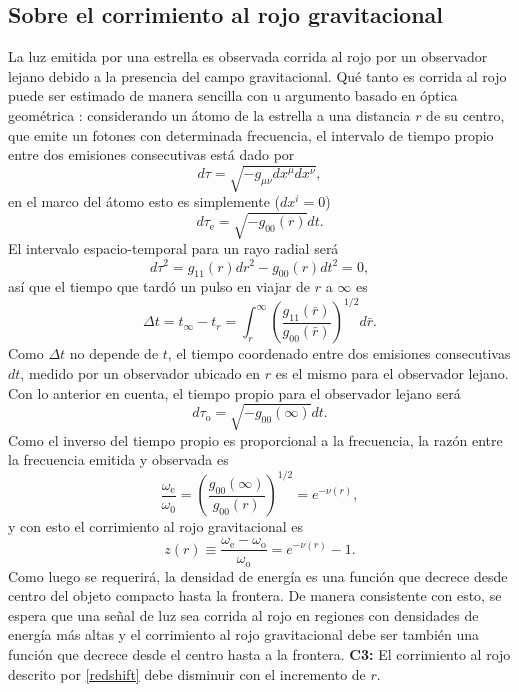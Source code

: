 \subsection*{ Sobre el corrimiento al rojo gravitacional}
\noindent La luz emitida por una estrella es observada corrida al rojo por un observador lejano debido a la presencia del campo gravitacional. Qué tanto es corrida al rojo puede ser estimado de manera sencilla con u argumento basado en óptica geométrica \cite{Glendenning2000}: considerando un átomo de la estrella a una distancia $r$ de su centro, que emite un fotones con determinada frecuencia, el intervalo de tiempo propio entre dos emisiones consecutivas está dado por
\begin{equation}
d \tau=\sqrt{-g_{\mu \nu} d x^{\mu} d x^{\nu}},
\end{equation}
en el marco del átomo esto es simplemente ($dx^i=0$)
\begin{equation}
d \tau_{\mathrm{e}}=\sqrt{-g_{00}(r)} d t.
\end{equation}
El intervalo espacio-temporal para un rayo radial será
\begin{equation}
d \tau^{2}=g_{11}(r) d r^{2} - g_{00}(r) d t^{2} = 0,
\end{equation}
así que el tiempo que tardó un pulso en viajar de $r$ a $\infty$ es
\begin{equation}\label{timeinterval}
\Delta t=t_{\infty}-t_{r}= \int_{r}^{\infty}\left(\frac{g_{11}(\bar{r})}{g_{00}(\bar{r})}\right)^{1 / 2} d \bar{r}.
\end{equation}
Como $\Delta{t}$ no depende de $t$, el tiempo coordenado entre dos emisiones consecutivas $dt$, medido por un observador ubicado en $r$ es el mismo para el observador lejano. Con lo anterior en cuenta, el tiempo propio para el observador lejano será
\begin{equation}
d \tau_{\mathrm{o}}=\sqrt{-g_{00}(\infty)} d t.
\end{equation}
Como el inverso del tiempo propio es proporcional a la frecuencia, la razón entre la frecuencia emitida y observada es
\begin{equation}
\frac{\omega_{\mathrm{e}}}{\omega_{\mathrm{0}}}=\left(\frac{g_{00}(\infty)}{g_{00}(r)}\right)^{1 / 2}=e^{-\nu(r)},
\end{equation}
y con esto el corrimiento al rojo gravitacional es
\begin{equation}
    z(r)\equiv \frac{\omega_{\mathrm{e}}-\omega_{\mathrm{o}}}{\omega_{\mathrm{o}}}  = e^{-\nu(r)}-1.
    \label{redshift}
\end{equation}
Como luego se requerirá, la densidad de energía es una función que decrece desde centro del objeto compacto hasta la frontera. De manera consistente con esto, se espera que una señal de luz sea corrida al rojo en regiones con densidades de energía más altas y el corrimiento al rojo gravitacional debe ser también una función que decrece desde el centro hasta a la frontera.
\textbf{C3:} El corrimiento al rojo descrito por \eqref{redshift} debe disminuir con el incremento de $r$.
